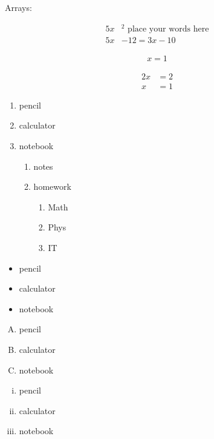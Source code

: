 \documentclass[11pt,  a4paper]{article}
\begin{document}
Arrays:

\begin{align}
5x&^2\text{ place your words here}\\
5x&-12=3x-10
\end{align}

\begin{align*}
x=1
\end{align*}

\begin{align}
2x&=2\\
x&=1
\end{align}

\begin{enumerate}
\item pencil
\item calculator
\item notebook
	\begin{enumerate}
	\item notes
	\item homework
		\begin{enumerate}
		\item Math
		\item Phys
		\item IT
		\end{enumerate}
	\end{enumerate}
\end{enumerate}

\vspace{0.5cm}

\begin{itemize}
\item pencil
\item calculator
\item notebook
\end{itemize}

\vspace{0.5cm}

\begin{enumerate}[A.]
\item pencil
\item calculator
\item notebook
\end{enumerate}


\vspace{0.5cm}

\begin{enumerate}[i.]
\item pencil
\item calculator
\item notebook
\end{enumerate}
\end{document}
